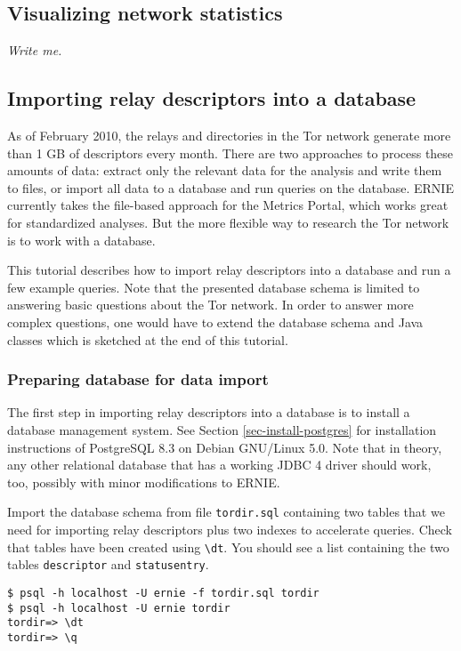 \documentclass{article}
\begin{document}
\subsection{Visualizing network statistics}

{\it Write me.}

\subsection{Importing relay descriptors into a database}

As of February 2010, the relays and directories in the Tor network
generate more than 1 GB of descriptors every month.
There are two approaches to process these amounts of data:
extract only the relevant data for the analysis and write them to files,
or import all data to a database and run queries on the database.
ERNIE currently takes the file-based approach for the Metrics Portal,
which works great for standardized analyses.
But the more flexible way to research the Tor network is to work with a
database.

This tutorial describes how to import relay descriptors into a database
and run a few example queries.
Note that the presented database schema is limited to answering basic
questions about the Tor network.
In order to answer more complex questions, one would have to extend the
database schema and Java classes which is sketched at the end of this
tutorial.

\subsubsection{Preparing database for data import}

The first step in importing relay descriptors into a database is to
install a database management system.
See Section \ref{sec-install-postgres} for installation instructions of
PostgreSQL 8.3 on Debian GNU/Linux 5.0.
Note that in theory, any other relational database that has a working JDBC
4 driver should work, too, possibly with minor modifications to ERNIE.

Import the database schema from file \verb+tordir.sql+ containing two
tables that we need for importing relay descriptors plus two indexes to
accelerate queries. Check that tables have been created using \verb+\dt+.
You should see a list containing the two tables \verb+descriptor+ and
\verb+statusentry+.

\begin{verbatim}
$ psql -h localhost -U ernie -f tordir.sql tordir
$ psql -h localhost -U ernie tordir
tordir=> \dt
tordir=> \q
\end{verbatim}
\end{document}
